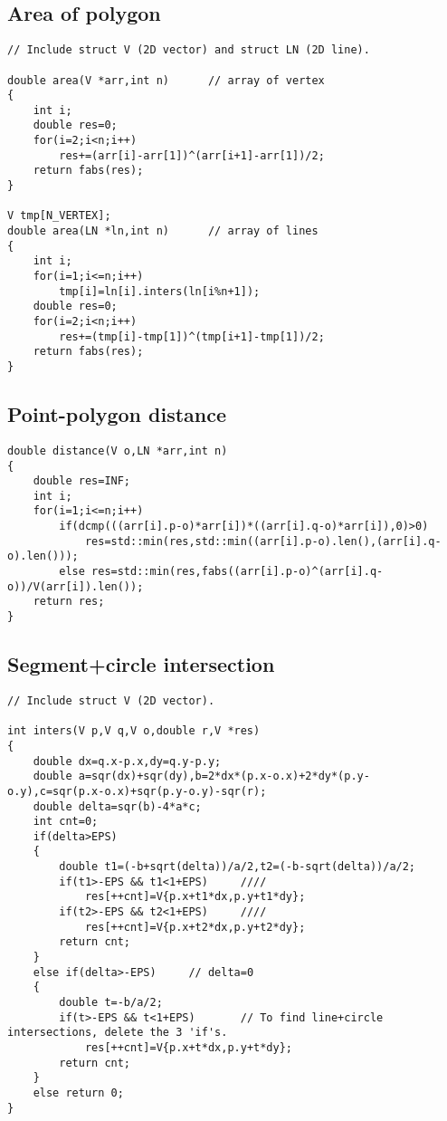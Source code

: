 \documentclass[a4paper,12pt]{article}
\begin{document}
\subsection{Area of polygon}
\begin{lstlisting}
// Include struct V (2D vector) and struct LN (2D line).

double area(V *arr,int n)      // array of vertex
{
    int i;
    double res=0;
    for(i=2;i<n;i++)
        res+=(arr[i]-arr[1])^(arr[i+1]-arr[1])/2;
    return fabs(res);
}
    
V tmp[N_VERTEX];
double area(LN *ln,int n)      // array of lines
{
    int i;
    for(i=1;i<=n;i++)
        tmp[i]=ln[i].inters(ln[i%n+1]);
    double res=0;
    for(i=2;i<n;i++)
        res+=(tmp[i]-tmp[1])^(tmp[i+1]-tmp[1])/2;
    return fabs(res);
}
\end{lstlisting}

\subsection{Point-polygon distance}
\begin{lstlisting}
double distance(V o,LN *arr,int n)
{
    double res=INF;
    int i;
    for(i=1;i<=n;i++)
        if(dcmp(((arr[i].p-o)*arr[i])*((arr[i].q-o)*arr[i]),0)>0)
            res=std::min(res,std::min((arr[i].p-o).len(),(arr[i].q-o).len()));
        else res=std::min(res,fabs((arr[i].p-o)^(arr[i].q-o))/V(arr[i]).len());
    return res;
}
\end{lstlisting}

\subsection{Segment+circle intersection}
\begin{lstlisting}
// Include struct V (2D vector).

int inters(V p,V q,V o,double r,V *res)
{
    double dx=q.x-p.x,dy=q.y-p.y;
    double a=sqr(dx)+sqr(dy),b=2*dx*(p.x-o.x)+2*dy*(p.y-o.y),c=sqr(p.x-o.x)+sqr(p.y-o.y)-sqr(r);
    double delta=sqr(b)-4*a*c;
    int cnt=0;
    if(delta>EPS)
    {
        double t1=(-b+sqrt(delta))/a/2,t2=(-b-sqrt(delta))/a/2;
        if(t1>-EPS && t1<1+EPS)     ////
            res[++cnt]=V{p.x+t1*dx,p.y+t1*dy};
        if(t2>-EPS && t2<1+EPS)     ////
            res[++cnt]=V{p.x+t2*dx,p.y+t2*dy};
        return cnt;
    }
    else if(delta>-EPS)     // delta=0
    {
        double t=-b/a/2;
        if(t>-EPS && t<1+EPS)       // To find line+circle intersections, delete the 3 'if's.
            res[++cnt]=V{p.x+t*dx,p.y+t*dy};
        return cnt;
    }
    else return 0;
}
\end{lstlisting}
\end{document}

